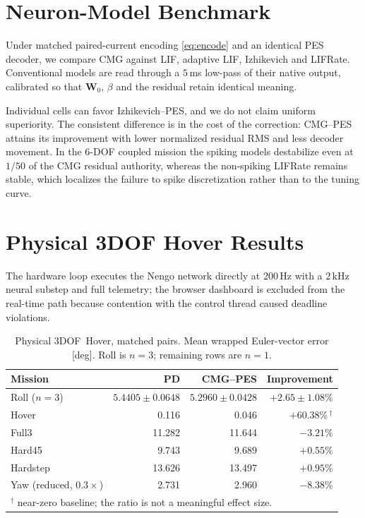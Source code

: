 \documentclass[letterpaper,10pt,conference]{IEEEtran}
\begin{document}
\section{Neuron-Model Benchmark}
\label{sec:neuron_benchmark}

Under matched paired-current encoding \eqref{eq:encode} and an identical
PES decoder, we compare CMG against LIF, adaptive LIF, Izhikevich
\cite{izhikevich2003} and LIFRate. Conventional models are read through a
$5$\,ms low-pass of their native output, calibrated so that $\bm W_0$,
$\beta$ and the residual retain identical meaning.

Individual cells can favor Izhikevich--PES, and we do not claim uniform
superiority. The consistent difference is in the cost of the correction:
CMG--PES attains its improvement with lower normalized residual RMS and
less decoder movement. In the 6-DOF coupled mission the spiking models
destabilize even at $1/50$ of the CMG residual authority, whereas the
non-spiking LIFRate remains stable, which localizes the failure to spike
discretization rather than to the tuning curve.

\section{Physical 3DOF Hover Results}
\label{sec:hover_results}

The hardware loop executes the Nengo network directly at $200$\,Hz with a
$2$\,kHz neural substep and full telemetry; the browser dashboard is
excluded from the real-time path because contention with the control thread
caused deadline violations.

\begin{table}[!t]
\caption{Physical 3DOF~Hover, matched pairs. Mean wrapped Euler-vector
error [deg]. Roll is $n=3$; remaining rows are $n=1$.}
\label{tab:hover}
\centering
\small
\begin{tabular}{lrrr}
\toprule
Mission & PD & CMG--PES & Improvement \\
\midrule
Roll ($n{=}3$) & $5.4405\pm0.0648$ & $5.2960\pm0.0428$
  & $+2.65\pm1.08\%$ \\
Hover   & 0.116  & 0.046  & $+60.38\%$\,$^{\dagger}$ \\
Full3   & 11.282 & 11.644 & $-3.21\%$ \\
Hard45  & 9.743  & 9.689  & $+0.55\%$ \\
Hardstep& 13.626 & 13.497 & $+0.95\%$ \\
Yaw (reduced, $0.3\times$) & 2.731 & 2.960 & $-8.38\%$ \\
\bottomrule
\multicolumn{4}{l}{\footnotesize $^{\dagger}$ near-zero baseline; the ratio
is not a meaningful effect size.}
\end{tabular}
\end{table}
\end{document}
